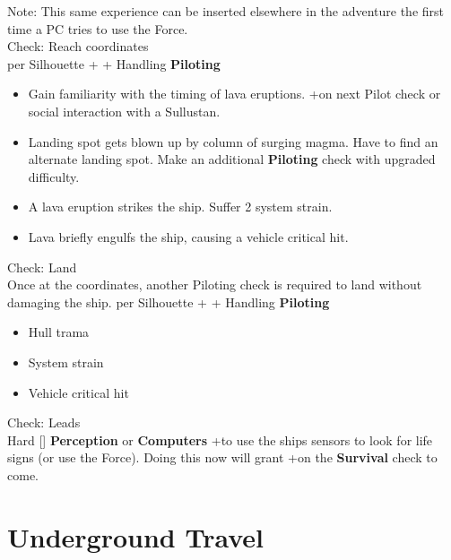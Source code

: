 \documentclass{book}
\newcommand{\df}{\difficulty}
\newcommand{\stb}{\setback}
\begin{document}
\begin{multicols*}{2}
Note: This same experience can be inserted elsewhere in the adventure the first time a PC tries to use the Force.\\
Check: Reach coordinates\\
\difficulty per Silhouette + \stb\stb\stb + Handling \textbf{Piloting}

\begin{itemize}
	\item \advantage Gain familiarity with the timing of lava eruptions.  +\boost on next Pilot check or social interaction with a Sullustan.
    \item \failure Landing spot gets blown up by column of surging magma. Have to find an alternate landing spot.  Make an additional \textbf{Piloting} check with upgraded difficulty.
	\item \threat \threat A lava eruption strikes the ship.  Suffer 2 system strain.
	\item \despair Lava briefly engulfs the ship, causing a vehicle critical hit.
\end{itemize}
Check: Land\\
Once at the coordinates, another Piloting check is required to land without damaging the ship.
\difficulty per Silhouette + \stb\stb + Handling \textbf{Piloting}
\begin{itemize}
    \item \failure Hull trama
    \item \threat System strain
	\item \despair Vehicle critical hit
\end{itemize}
Check: Leads\\
Hard [\df\df\df] \textbf{Perception} or \textbf{Computers} +\setback to use the ships sensors to look for life signs (or use the Force). Doing this now will grant +\boost on the \textbf{Survival} check to come.

\section{Underground Travel}


\end{multicols*}
\end{document}
